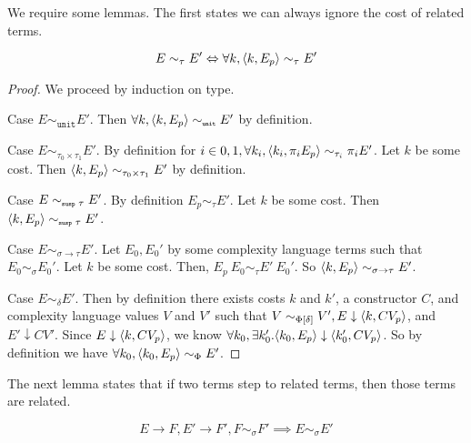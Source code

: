 We require some lemmas.  The first states we can always ignore the cost of
related terms.
%
\begin{lemma}
  \label{lem:ignorecost}
\[
  E \sim_\tau E' \Leftrightarrow \forall k, \langle k, E_p \rangle \sim_\tau E'
\]
\end{lemma}
%
\begin{proof}
  We proceed by induction on type.

  Case $E \sim_{\texttt{unit}} E'$.
  Then $\forall k, \langle k, E_p \rangle \sim_{\texttt{\tiny{unit}}} E'$ by definition.

  Case $E \sim_{\tau_0 \times \tau_1} E'$.
  By definition for $i\in{0,1}, \forall k_i, \langle k_i, \pi_i E_p \rangle \sim_{\tau_i} \pi_i E'$.
  Let $k$ be some cost.
  Then $\langle k, E_p \rangle \sim_{\tau_0 \times \tau_1} E'$ by definition.

  Case $E \sim_{\texttt{\tiny{susp }} \tau} E'$.
  By definition $E_p \sim_\tau E'$.
  Let $k$ be some cost.
  Then $\langle k, E_p \rangle \sim_{\texttt{\tiny{susp }} \tau} E'$.

  Case $E \sim_{\sigma \to \tau} E'$.
  Let $E_0, E_0'$ by some complexity language terms such that $E_0 \sim_\sigma E_0'$.
  Let $k$ be some cost.
  Then, $E_p\ E_0 \sim_\tau E'\ E_0'$.
  So $\langle k, E_p \rangle \sim_{\sigma \to \tau} E'$.

  Case $E \sim_\delta E'$.
  Then by definition there exists costs $k$ and $k'$, a constructor $C$, and complexity language values $V$ and $V'$ such that $V \sim_{\Phi[\delta]} V', E \downarrow \langle k, C V_p \rangle$, and $E' \downarrow C V'$.
  Since $E \downarrow \langle k, C V_p \rangle$, we know $\forall k_0, \exists k_0'. \langle k_0, E_p \rangle \downarrow \langle k_0', C V_p \rangle$.
  So by definition we have $\forall k_0, \langle k_0, E_p \rangle \sim_\Phi E'$.
\end{proof}
%
The next lemma states that if two terms step to related terms, then those terms
are related.
%
\begin{lemma}
  \label{lem:relatedstepback}
  \[
    E \to F, E' \to F', F \sim_\sigma F' \implies E \sim_\sigma E'
  \]
\end{lemma}
%
